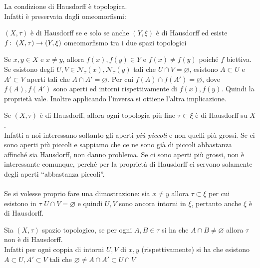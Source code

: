 \begin{remark}
	La condizione di Hausdorff è topologica. \\  Infatti è preservata dagli omeomorfismi:
	\begin{center}
		$(X,\tau)$ è di Hausdorff se e solo se anche $(Y,\xi)$ è di Hausdorff ed esiste $f \colon\ (X,\tau) \rightarrow (Y,\xi)$ omeomorfismo tra i due spazi topologici
	\end{center}
	 Se $x,y \in X$ e $x\neq y$, allora $f(x), f(y) \in Y$ e $f(x) \neq f(y)$ poiché $f$ biettiva. Se esistono degli $U,V\in \mathcal{N}_\tau(x),\mathcal{N}_\tau(y)$ tali che $U \cap V = \varnothing$, esistono $A \subset U$ e $A' \subset V$ aperti tali che $A \cap A' = \varnothing$. Per cui $f(A) \cap f(A') = \varnothing$, dove $f(A), f(A')$ sono aperti ed intorni rispettivamente di $f(x),f(y)$. Quindi la proprietà vale. Inoltre applicando l'inversa si ottiene l'altra implicazione.
\end{remark} 
\begin{remark}
	Se $(X, \tau)$ è di Hausdorff, allora ogni topologia più fine $\tau \subset \xi$ è di Hausdorff su $X$. \\ Infatti a noi interessano soltanto gli aperti \textit{più piccoli} e non quelli più grossi. Se ci sono aperti più piccoli e sappiamo che ce ne sono già di piccoli abbastanza affinché sia Hausdorff, non danno problema. Se ci sono aperti più grossi, non è interessante comunque, perché per la proprietà di Hausdorff ci servono solamente degli aperti \enquote{abbastanza piccoli}. \\ \\ Se si volesse proprio fare una dimostrazione: sia $x \neq y$ allora $\tau \subset \xi$ per cui esistono in $\tau$ $U \cap V = \varnothing$ e quindi $U, V$ sono ancora intorni in $\xi$, pertanto anche $\xi$ è di Hausdorff. 
\end{remark}
\begin{remark}
	Sia $(X, \tau)$ spazio topologico, se per ogni $A, B\in \tau$ si ha che $A\cap B \neq \varnothing$ allora $\tau$ non è di Hausdorff. \\ Infatti per ogni coppia di intorni $U, V$ di $x, y$ (rispettivamente) si ha che esistono $A \subset U, A' \subset V$ tali che $\varnothing \neq A\cap A' \subset U \cap V$
\end{remark} 

